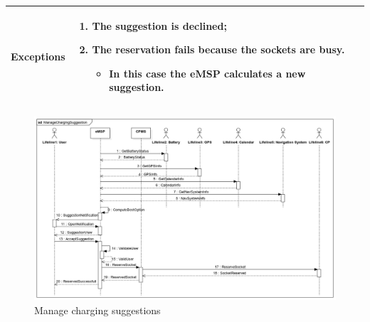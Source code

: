 \documentclass{Configuration_Files/PoliMi3i_thesis}
\begin{document}
\begin{table}[H]
\begin{xltabular}{\textwidth}{| >{}l | X |}
    \hline
    \textbf{Exceptions} & \begin{enumerate}
        \item The suggestion is declined;
        \item The reservation fails because the sockets are busy.
        \begin{itemize}
            \item In this case the eMSP calculates a new suggestion.
        \end{itemize}
        \end{enumerate}\B\\
    \hline
    \end{xltabular}
\end{table}

\begin{figure}[H]
    \centering
    \includegraphics[width=1\textwidth]{Images/UseCases/ManageChargingSuggestion.jpg}
    \caption{Manage charging suggestions}
\end{figure}

\end{document}
